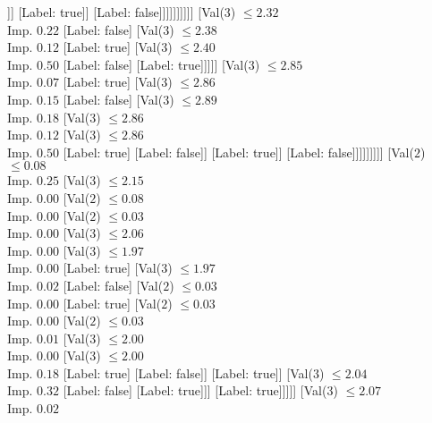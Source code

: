 \documentclass[margin=10pt]{standalone}
\begin{document}
\begin{forest}
																			[Label: false]
																			[Val($3$) $ \leq 2.71$ \\ Imp. $0.38$
																				[Label: true]
																				[Label: false]]]
																		[Label: true]]
																	[Label: false]]]]]]]]]]
								[Val($3$) $ \leq 2.32$ \\ Imp. $0.22$
									[Label: false]
									[Val($3$) $ \leq 2.38$ \\ Imp. $0.12$
										[Label: true]
										[Val($3$) $ \leq 2.40$ \\ Imp. $0.50$
											[Label: false]
											[Label: true]]]]]
							[Val($3$) $ \leq 2.85$ \\ Imp. $0.07$
								[Label: true]
								[Val($3$) $ \leq 2.86$ \\ Imp. $0.15$
									[Label: false]
									[Val($3$) $ \leq 2.89$ \\ Imp. $0.18$
										[Val($3$) $ \leq 2.86$ \\ Imp. $0.12$
											[Val($3$) $ \leq 2.86$ \\ Imp. $0.50$
												[Label: true]
												[Label: false]]
											[Label: true]]
										[Label: false]]]]]]]]]
		[Val($2$) $ \leq 0.08$ \\ Imp. $0.25$
			[Val($3$) $ \leq 2.15$ \\ Imp. $0.00$
				[Val($2$) $ \leq 0.08$ \\ Imp. $0.00$
					[Val($2$) $ \leq 0.03$ \\ Imp. $0.00$
						[Val($3$) $ \leq 2.06$ \\ Imp. $0.00$
							[Val($3$) $ \leq 1.97$ \\ Imp. $0.00$
								[Label: true]
								[Val($3$) $ \leq 1.97$ \\ Imp. $0.02$
									[Label: false]
									[Val($2$) $ \leq 0.03$ \\ Imp. $0.00$
										[Label: true]
										[Val($2$) $ \leq 0.03$ \\ Imp. $0.00$
											[Val($2$) $ \leq 0.03$ \\ Imp. $0.01$
												[Val($3$) $ \leq 2.00$ \\ Imp. $0.00$
													[Val($3$) $ \leq 2.00$ \\ Imp. $0.18$
														[Label: true]
														[Label: false]]
													[Label: true]]
												[Val($3$) $ \leq 2.04$ \\ Imp. $0.32$
													[Label: false]
													[Label: true]]]
											[Label: true]]]]]
							[Val($3$) $ \leq 2.07$ \\ Imp. $0.02$

\end{forest}
\end{document}
